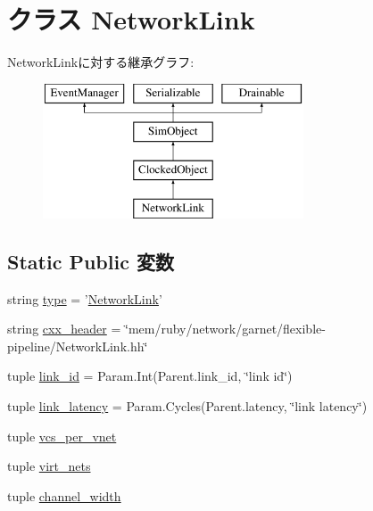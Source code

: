 \hypertarget{classGarnetLink_1_1NetworkLink}{
\section{クラス NetworkLink}
\label{classGarnetLink_1_1NetworkLink}
}
NetworkLinkに対する継承グラフ:\begin{figure}[H]
\begin{center}
\leavevmode
\includegraphics[height=4cm]{classGarnetLink_1_1NetworkLink}
\end{center}
\end{figure}
\subsection*{Static Public 変数}
\begin{DoxyCompactItemize}
\item 
string \hyperlink{classGarnetLink_1_1NetworkLink_acce15679d830831b0bbe8ebc2a60b2ca}{type} = '\hyperlink{classGarnetLink_1_1NetworkLink}{NetworkLink}'
\item 
string \hyperlink{classGarnetLink_1_1NetworkLink_a17da7064bc5c518791f0c891eff05fda}{cxx\_\-header} = \char`\"{}mem/ruby/network/garnet/flexible-\/pipeline/NetworkLink.hh\char`\"{}
\item 
tuple \hyperlink{classGarnetLink_1_1NetworkLink_a68ad93ab49e865b9e80829c3ee7130c7}{link\_\-id} = Param.Int(Parent.link\_\-id, \char`\"{}link id\char`\"{})
\item 
tuple \hyperlink{classGarnetLink_1_1NetworkLink_aee092f519cc5d61dc0287dff3edd11ab}{link\_\-latency} = Param.Cycles(Parent.latency, \char`\"{}link latency\char`\"{})
\item 
tuple \hyperlink{classGarnetLink_1_1NetworkLink_a2bb2221cda9b94b6a0c2944d8a12f31e}{vcs\_\-per\_\-vnet}
\item 
tuple \hyperlink{classGarnetLink_1_1NetworkLink_a84c7a415611bc1b55aa5e7fd9e9601e8}{virt\_\-nets}
\item 
tuple \hyperlink{classGarnetLink_1_1NetworkLink_a1129edba1db6bd1f0c3d1ddda4be3d9d}{channel\_\-width}
\end{DoxyCompactItemize}


